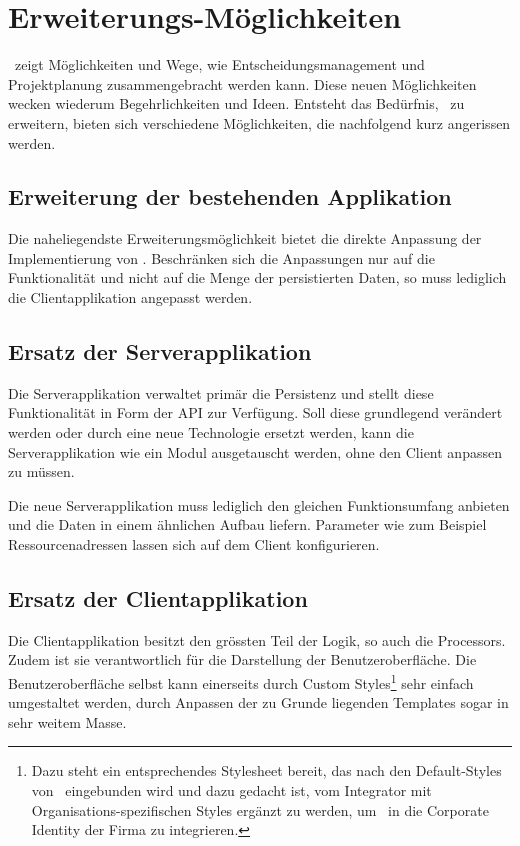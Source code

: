 	
	\section{Erweiterungs-Möglichkeiten}
		\eeppi\ zeigt Möglichkeiten und Wege, wie Entscheidungsmanagement und Projektplanung zusammengebracht werden kann.
		Diese neuen Möglichkeiten wecken wiederum Begehrlichkeiten und Ideen.
		Entsteht das Bedürfnis, \eeppi\ zu erweitern, bieten sich verschiedene Möglichkeiten, die nachfolgend kurz angerissen werden.
		

		\subsection{Erweiterung der bestehenden Applikation}
			Die naheliegendste Erweiterungsmöglichkeit bietet die direkte Anpassung der Implementierung von \eeppi.
			Beschränken sich die Anpassungen nur auf die Funktionalität und nicht auf die Menge der persistierten Daten, so muss lediglich die Clientapplikation angepasst werden.
	
		\subsection{Ersatz der Serverapplikation}
			Die Serverapplikation verwaltet primär die Persistenz und stellt diese Funktionalität in Form der API zur Verfügung.
			Soll diese grundlegend verändert werden oder durch eine neue Technologie ersetzt werden,
			kann die Serverapplikation wie ein Modul ausgetauscht werden, ohne den Client anpassen zu müssen.
			
			Die neue Serverapplikation muss lediglich den gleichen Funktionsumfang anbieten und die Daten in einem ähnlichen Aufbau liefern.
			Parameter wie zum Beispiel Ressourcenadressen lassen sich auf dem Client konfigurieren. 
	
		\subsection{Ersatz der Clientapplikation}
			Die Clientapplikation besitzt den grössten Teil der Logik, so auch die Processors.
			Zudem ist sie verantwortlich für die Darstellung der Benutzeroberfläche.
			Die Benutzeroberfläche selbst kann einerseits durch Custom Styles\footnote{Dazu steht ein entsprechendes Stylesheet bereit, das nach den Default-Styles von \eeppi\ eingebunden wird und dazu gedacht ist, vom Integrator mit Organisations-spezifischen Styles ergänzt zu werden, um \eeppi\ in die Corporate Identity der Firma zu integrieren.} sehr einfach umgestaltet werden, durch Anpassen der zu Grunde liegenden Templates sogar in sehr weitem Masse.
			
